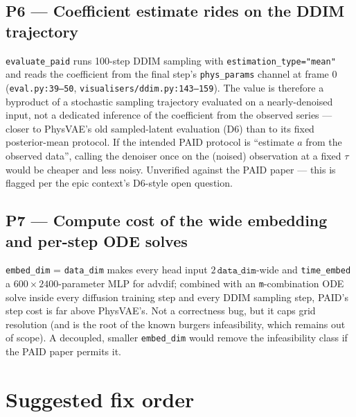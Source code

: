 \documentclass[11pt,a4paper]{article}
\newcommand{\code}[1]{\texttt{#1}}
\begin{document}
\subsection*{P6 --- Coefficient estimate rides on the DDIM trajectory}

\code{evaluate\_paid} runs 100-step DDIM sampling with
\code{estimation\_type="mean"} and reads the coefficient from the final step's
\code{phys\_params} channel at frame 0 (\code{eval.py:39--50},
\code{visualisers/ddim.py:143--159}). The value is therefore a byproduct of a
stochastic sampling trajectory evaluated on a nearly-denoised input, not a
dedicated inference of the coefficient from the observed series --- closer to
PhysVAE's old sampled-latent evaluation (D6) than to its fixed posterior-mean
protocol. If the intended PAID protocol is ``estimate $a$ from the observed
data'', calling the denoiser once on the (noised) observation at a fixed $\tau$
would be cheaper and less noisy. Unverified against the PAID paper --- this is
flagged per the epic context's D6-style open question.

\subsection*{P7 --- Compute cost of the wide embedding and per-step ODE solves}

\code{embed\_dim} = \code{data\_dim} makes every head input
$2\,\code{data\_dim}$-wide and \code{time\_embed} a
$600 \times 2400$-parameter MLP for advdif; combined with an \code{m}-combination
ODE solve inside every diffusion training step and every DDIM sampling step,
PAID's step cost is far above PhysVAE's. Not a correctness bug, but it caps grid
resolution (and is the root of the known burgers infeasibility, which remains out
of scope). A decoupled, smaller \code{embed\_dim} would remove the infeasibility
class if the PAID paper permits it.

\section{Suggested fix order}
\end{document}
